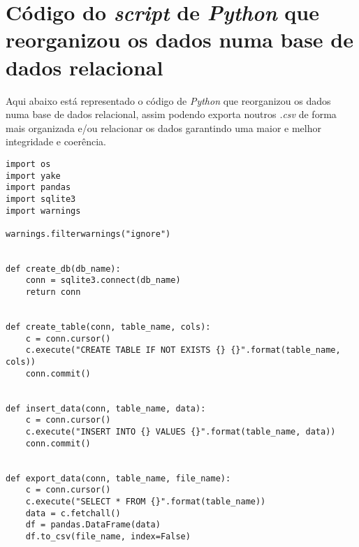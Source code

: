 \chapter{Código do \textit{script} de \textit{Python} que reorganizou os dados numa base de dados relacional}
\label{ap9}

Aqui abaixo está representado o código de \textit{Python} que reorganizou os dados numa base de dados relacional, assim podendo exporta noutros \textit{.csv} de forma mais organizada e/ou relacionar os dados garantindo uma maior e melhor integridade e coerência.

\begin{verbatim}
import os
import yake
import pandas
import sqlite3
import warnings

warnings.filterwarnings("ignore")


def create_db(db_name):
    conn = sqlite3.connect(db_name)
    return conn


def create_table(conn, table_name, cols):
    c = conn.cursor()
    c.execute("CREATE TABLE IF NOT EXISTS {} {}".format(table_name, cols))
    conn.commit()


def insert_data(conn, table_name, data):
    c = conn.cursor()
    c.execute("INSERT INTO {} VALUES {}".format(table_name, data))
    conn.commit()


def export_data(conn, table_name, file_name):
    c = conn.cursor()
    c.execute("SELECT * FROM {}".format(table_name))
    data = c.fetchall()
    df = pandas.DataFrame(data)
    df.to_csv(file_name, index=False)



\end{verbatim}
